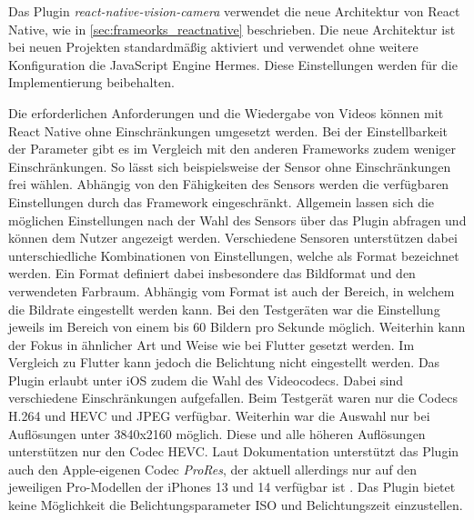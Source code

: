 Das Plugin \textit{react-native-vision-camera} verwendet die neue Architektur von React Native, wie in \autoref{sec:frameorks_reactnative} beschrieben.
Die neue Architektur ist bei neuen Projekten standardmäßig aktiviert und verwendet ohne weitere Konfiguration die JavaScript Engine Hermes.
Diese Einstellungen werden für die Implementierung beibehalten.

Die erforderlichen Anforderungen und die Wiedergabe von Videos können mit React Native ohne Einschränkungen umgesetzt werden.
Bei der Einstellbarkeit der Parameter gibt es im Vergleich mit den anderen Frameworks zudem weniger Einschränkungen.
So lässt sich beispielsweise der Sensor ohne Einschränkungen frei wählen.
Abhängig von den Fähigkeiten des Sensors werden die verfügbaren Einstellungen durch das Framework eingeschränkt.
Allgemein lassen sich die möglichen Einstellungen nach der Wahl des Sensors über das Plugin abfragen und können dem Nutzer angezeigt werden.
Verschiedene Sensoren unterstützen dabei unterschiedliche Kombinationen von Einstellungen, welche als Format bezeichnet werden.
Ein Format definiert dabei insbesondere das Bildformat und den verwendeten Farbraum.
Abhängig vom Format ist auch der Bereich, in welchem die Bildrate eingestellt werden kann.
Bei den Testgeräten war die Einstellung jeweils im Bereich von einem bis 60 Bildern pro Sekunde möglich.
Weiterhin kann der Fokus in ähnlicher Art und Weise wie bei Flutter gesetzt werden.
Im Vergleich zu Flutter kann jedoch die Belichtung nicht eingestellt werden.
Das Plugin erlaubt unter iOS zudem die Wahl des Videocodecs.
Dabei sind verschiedene Einschränkungen aufgefallen.
Beim Testgerät waren nur die Codecs H.264 und \ac{HEVC} und JPEG verfügbar.
Weiterhin war die Auswahl nur bei Auflösungen unter 3840x2160 möglich.
Diese und alle höheren Auflösungen unterstützen nur den Codec \ac{HEVC}.
Laut Dokumentation unterstützt das Plugin auch den Apple-eigenen Codec \textit{ProRes}, der aktuell allerdings nur auf den jeweiligen Pro-Modellen der iPhones 13 und 14 verfügbar ist \cite{Prores_iPhone13}.
Das Plugin bietet keine Möglichkeit die Belichtungsparameter ISO und Belichtungszeit einzustellen.


